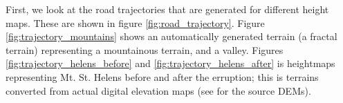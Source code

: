 First, we look at the road trajectories that are generated for different height maps. These are shown in figure \ref{fig:road_trajectory}. Figure \ref{fig:trajectory_mountains} shows an automatically generated terrain (a fractal terrain) representing a mountainous terrain, and a valley. Figures \ref{fig:trajectory_helens_before} and \ref{fig:trajectory_helens_after} is heightmaps representing Mt. St. Helens before and after the erruption; this is terrains converted from actual digital elevation maps (see \cite{helens_dem} for the source DEMs).

\begin{figure}[ht]
\centering
{}\\
\quad

\end{figure}
